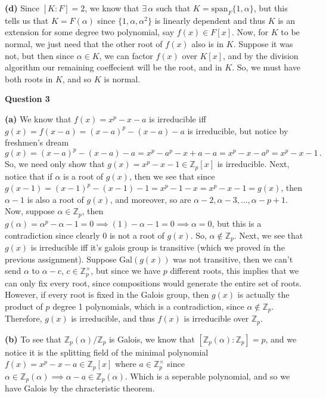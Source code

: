 \documentclass[10pt]{article}
\newcommand{\Z}{\mathbb{Z}}
\newcommand{\Gal}{\text{Gal}}
\begin{document}
\textbf{(d)} Since $[K:F] = 2$, we know that $\exists\, \alpha$ such that $K = \text{span}_{F}\{1,\alpha\}$, but this tells us that $K = F(\alpha)$ since $\{1,\alpha,\alpha^{2}\}$ is linearly dependent and thus $K$ is an extension for some degree two polynomial, say $f(x) \in F[x]$. Now, for $K$ to be normal, we just need that the other root of $f(x)$ also is in $K$. Suppose it was not, but then since $\alpha \in K$, we can factor $f(x)$ over $K[x]$, and by the division algorithm our remaining coeffecient will be the root, and in $K$. So, we must have both roots in $K$, and so $K$ is normal.

\newpage
\textbf{Question 3}

\textbf{(a)} We know that $f(x) = x^{p} - x - a$ is irreducible iff $g(x) = f(x-a) = (x-a)^{p} - (x-a) - a$ is irreducible, but notice by freshmen's dream
\[ g(x) = (x-a)^{p} - (x-a) -a = x^{p} - a^{p} - x + a - a = x^{p} - x - a^{p} = x^{p} - x - 1 \, .\]
So, we need only show that $g(x) = x^{p} - x - 1 \in \Z_{p}[x]$ is irreducible. Next, notice that if $\alpha$ is a root of $g(x)$, then we see that since $g(x - 1) = (x - 1)^{p} - (x - 1) - 1 = x^{p} - 1 - x = x^{p} - x - 1 = g(x)$, then $\alpha - 1$ is also a root of $g(x)$, and moreover, so are $\alpha - 2, \alpha - 3, \dots, \alpha - p +1$. Now, suppose $\alpha \in \Z_{p}$, then $g(\alpha) = \alpha^{p} - \alpha - 1 = 0 \implies (1) - \alpha - 1 = 0 \implies \alpha = 0$, but this is a contradiction since clearly $0$ is not a root of $g(x)$. So, $\alpha \notin \Z_{p}$. Next, we see that $g(x)$ is irreducible iff it's galois group is transitive (which we proved in the previous assignment). Suppose $\Gal(g(x))$ was not transitive, then we can't send $\alpha$ to $\alpha - c$, $c\in \Z_{p}^{\times}$, but since we have $p$ different roots, this implies that we can only fix every root, since compositions would generate the entire set of roots. However, if every root is fixed in the Galois group, then $g(x)$ is actually the product of $p$ degree 1 polynomials, which is a contradiction, since $\alpha \notin \Z_{p}$. Therefore, $g(x)$ is irreducible, and thus $f(x)$ is irreducible over $\Z_{p}$.

\textbf{(b)} To see that $\Z_{p}(\alpha)/\Z_{p}$ is Galois, we know that $[\Z_{p}(\alpha):\Z_{p}] = p$, and we notice it is the splitting field of the minimal polynomial $f(x) = x^{p} - x - a \in \Z_{p}[x]$ where $a \in \Z_{p}^{\times}$ since $\alpha \in \Z_{p}(\alpha) \implies \alpha - a \in \Z_{p}(\alpha)$. Which is a seperable polynomial, and so we have Galois by the chracteristic theorem.
\end{document}

